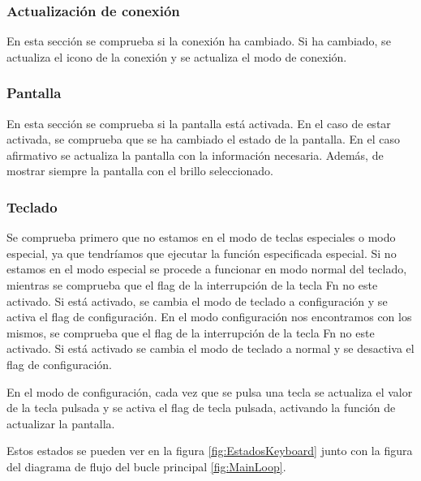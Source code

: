\subsubsection{Actualización de conexión}
En esta sección se comprueba si la conexión ha cambiado. Si ha cambiado, se actualiza el icono de la conexión y se actualiza el modo de conexión.

\subsubsection{Pantalla}
En esta sección se comprueba si la pantalla está activada. En el caso de estar activada, se comprueba que se ha cambiado el estado de la pantalla. En el caso afirmativo se actualiza la pantalla con la información necesaria. Además, de mostrar siempre la pantalla con el brillo seleccionado.

\subsubsection{Teclado}
Se comprueba primero que no estamos en el modo de teclas especiales o modo especial, ya que tendríamos que ejecutar la función especificada especial.
Si no estamos en el modo especial se procede a funcionar en modo normal del teclado, mientras se comprueba que el flag de la interrupción de la tecla Fn no este activado. Si está activado, se cambia el modo de teclado a configuración y se activa el flag de configuración.
En el modo configuración nos encontramos con los mismos, se comprueba que el flag de la interrupción de la tecla Fn no este activado. Si está activado se cambia el modo de teclado a normal y se desactiva el flag de configuración.

En el modo de configuración, cada vez que se pulsa una tecla se actualiza el valor de la tecla pulsada y se activa el flag de tecla pulsada, activando la función de actualizar la pantalla.

Estos estados se pueden ver en la figura \ref{fig:EstadosKeyboard} junto con la figura del diagrama de flujo del bucle principal \ref{fig:MainLoop}.

